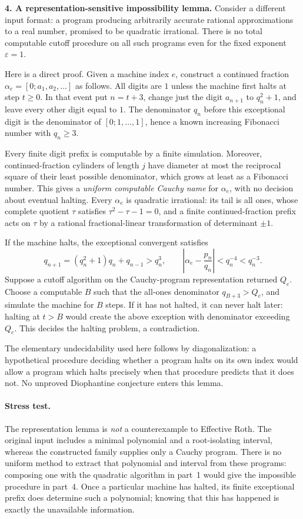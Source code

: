 \documentclass[11pt,a4paper]{article}
\newcommand{\eps}{\varepsilon}
\begin{document}
\textbf{4. A representation-sensitive impossibility lemma.}
Consider a different input format: a program producing arbitrarily accurate
rational approximations to a real number, promised to be quadratic
irrational. There is no total computable cutoff procedure on all such
programs even for the fixed exponent $\eps=1$.

Here is a direct proof. Given a machine index $e$, construct a continued
fraction $\alpha_e=[0;a_1,a_2,\ldots]$ as follows. All digits are $1$ unless
the machine first halts at step $t\ge0$. In that event put $n=t+3$, change
just the digit $a_{n+1}$ to $q_n^2+1$, and leave every other digit equal to
$1$. The denominator $q_n$ before this exceptional digit is the denominator
of $[0;1,\ldots,1]$, hence a known increasing Fibonacci number with
$q_n\ge3$.

Every finite digit prefix is computable by a finite simulation. Moreover,
continued-fraction cylinders of length $j$ have diameter at most the
reciprocal square of their least possible denominator, which grows at least
as a Fibonacci number. This gives a \emph{uniform computable Cauchy name}
for $\alpha_e$, with no decision about eventual halting. Every $\alpha_e$
is quadratic irrational: its tail is all ones, whose complete quotient
$\tau$ satisfies $\tau^2-\tau-1=0$, and a finite continued-fraction prefix
acts on $\tau$ by a rational fractional-linear transformation of determinant
$\pm1$.

If the machine halts, the exceptional convergent satisfies
\[
 q_{n+1}=(q_n^2+1)q_n+q_{n-1}>q_n^3,
 \qquad
 \left|\alpha_e-\frac{p_n}{q_n}\right|<q_n^{-4}<q_n^{-3}.
\]
Suppose a cutoff algorithm on the Cauchy-program representation returned
$Q_e$. Choose a computable $B$ such that the all-ones denominator
$q_{B+3}>Q_e$, and simulate the machine for $B$ steps. If it has not halted,
it can never halt later: halting at $t>B$ would create the above exception
with denominator exceeding $Q_e$. This decides the halting problem, a
contradiction.

The elementary undecidability used here follows by diagonalization: a
hypothetical procedure deciding whether a program halts on its own index
would allow a program which halts precisely when that procedure predicts
that it does not. No unproved Diophantine conjecture enters this lemma.

\paragraph{Stress test.}
The representation lemma is \emph{not} a counterexample to Effective Roth.
The original input includes a minimal polynomial and a root-isolating
interval, whereas the constructed family supplies only a Cauchy program.
There is no uniform method to extract that polynomial and interval from
these programs: composing one with the quadratic algorithm in part~1
would give the impossible procedure in part~4. Once a particular machine
has halted, its finite exceptional prefix does determine such a polynomial;
knowing that this has happened is exactly the unavailable information.
\end{document}
